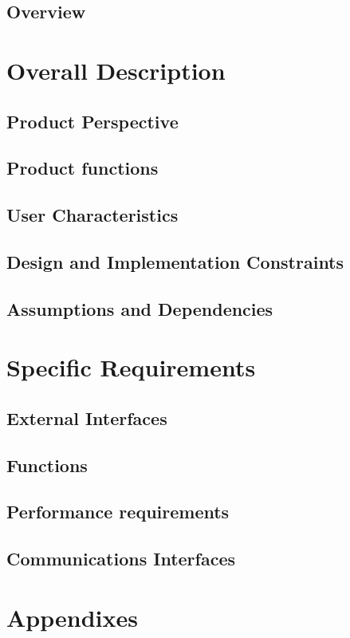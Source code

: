\documentclass{article}
\begin{document}
	\subsection{Overview}

\section{Overall Description}
	\subsection{Product Perspective}
	\subsection{Product functions}
	\subsection{User Characteristics}
	\subsection{Design and Implementation Constraints}
	\subsection{Assumptions and Dependencies}

\section{Specific Requirements}
	\subsection{External Interfaces}
	\subsection{Functions}
	\subsection{Performance requirements}
	\subsection{Communications Interfaces}

\section{Appendixes}
\end{document}
